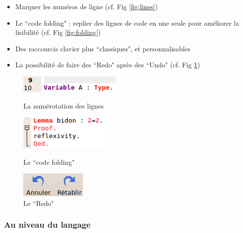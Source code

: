             \begin{itemize}
                \item Marquer les numéros de ligne (cf. Fig \ref{fig:lines})
                \item Le ``code folding" : replier des lignes de code en une seule pour améliorer la lisibilité (cf. Fig \ref{fig:folding})
                \item Des raccourcis clavier plus ``classiques", et personnalisables
                \item La possibilité de faire des ``Redo" après des ``Undo" (cf. Fig \ref{fig:redo})
            \end{itemize}
            \begin{figure}[ht]
                \begin{minipage}[b]{0.3\linewidth}
                    \centering
                    \includegraphics[scale=0.5]{../images/ide/lines.png}
                    \caption{La numérotation des lignes}
                    \label{fig:lines}
                \end{minipage}
                \hfill
                \begin{minipage}[b]{0.3\linewidth}   
	                \centering
	                \includegraphics[scale=0.5]{../images/ide/folding.png}
	                \caption{Le ``code folding"}
	                \label{fig:folding}
                \end{minipage}
                \hfill
                \begin{minipage}[b]{0.3\linewidth}   
	                \centering
	                \includegraphics[scale=0.5]{../images/ide/redo.png}
	                \caption{Le ``Redo"}
	                \label{fig:redo}
	            \end{minipage}
            \end{figure}
            
        \subsubsection{Au niveau du langage}


